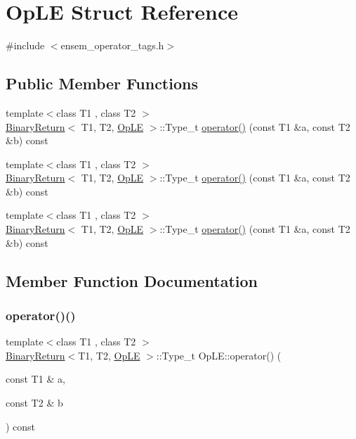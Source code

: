 \hypertarget{structOpLE}{}\section{Op\+LE Struct Reference}
\label{structOpLE}


{\ttfamily \#include $<$ensem\+\_\+operator\+\_\+tags.\+h$>$}

\subsection*{Public Member Functions}
\begin{DoxyCompactItemize}
\item 
{\footnotesize template$<$class T1 , class T2 $>$ }\\\mbox{\hyperlink{structBinaryReturn}{Binary\+Return}}$<$ T1, T2, \mbox{\hyperlink{structOpLE}{Op\+LE}} $>$\+::Type\+\_\+t \mbox{\hyperlink{structOpLE_a59addad5005738f86a6d4a5216c9348f}{operator()}} (const T1 \&a, const T2 \&b) const
\item 
{\footnotesize template$<$class T1 , class T2 $>$ }\\\mbox{\hyperlink{structBinaryReturn}{Binary\+Return}}$<$ T1, T2, \mbox{\hyperlink{structOpLE}{Op\+LE}} $>$\+::Type\+\_\+t \mbox{\hyperlink{structOpLE_a59addad5005738f86a6d4a5216c9348f}{operator()}} (const T1 \&a, const T2 \&b) const
\item 
{\footnotesize template$<$class T1 , class T2 $>$ }\\\mbox{\hyperlink{structBinaryReturn}{Binary\+Return}}$<$ T1, T2, \mbox{\hyperlink{structOpLE}{Op\+LE}} $>$\+::Type\+\_\+t \mbox{\hyperlink{structOpLE_a59addad5005738f86a6d4a5216c9348f}{operator()}} (const T1 \&a, const T2 \&b) const
\end{DoxyCompactItemize}


\subsection{Member Function Documentation}
\mbox{\label{structOpLE_a59addad5005738f86a6d4a5216c9348f}} 
\subsubsection{\texorpdfstring{operator()()}{operator()()}\hspace{0.1cm}{\footnotesize\ttfamily [1/3]}}
{\footnotesize\ttfamily template$<$class T1 , class T2 $>$ \\
\mbox{\hyperlink{structBinaryReturn}{Binary\+Return}}$<$T1, T2, \mbox{\hyperlink{structOpLE}{Op\+LE}} $>$\+::Type\+\_\+t Op\+L\+E\+::operator() (\begin{DoxyParamCaption}\item[{const T1 \&}]{a,  }\item[{const T2 \&}]{b }\end{DoxyParamCaption}) const\hspace{0.3cm}{\ttfamily [inline]}}

